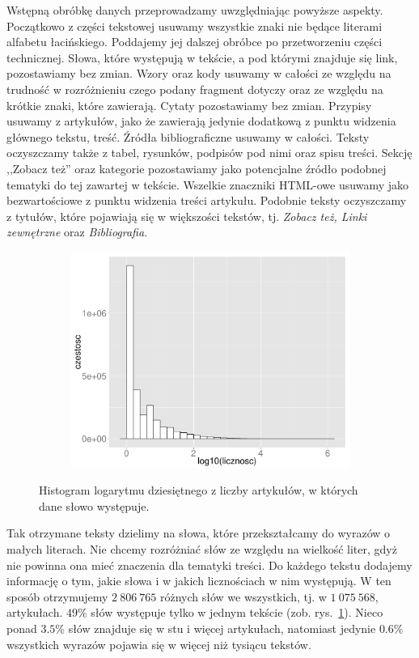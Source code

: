 \documentclass{praca1}
\begin{document}
Wstępną obróbkę danych przeprowadzamy uwzględniając powyższe aspekty. Początkowo z części tekstowej usuwamy wszystkie znaki nie będące literami alfabetu łacińskiego. Poddajemy jej dalszej obróbce po przetworzeniu części technicznej. Słowa, które występują w tekście, a pod którymi znajduje się link, pozostawiamy bez zmian. Wzory oraz kody usuwamy w całości ze względu na trudność w rozróżnieniu czego podany fragment dotyczy oraz ze względu na krótkie znaki, które zawierają. Cytaty pozostawiamy bez zmian. Przypisy usuwamy z artykułów, jako że zawierają jedynie dodatkową z punktu widzenia głównego tekstu, treść. Źródła bibliograficzne usuwamy w całości. Teksty oczyszczamy także z tabel, rysunków, podpisów pod nimi oraz spisu treści. Sekcję ,,Zobacz też'' oraz kategorie pozostawiamy jako potencjalne źródło podobnej tematyki do tej zawartej w tekście. Wszelkie znaczniki HTML-owe usuwamy jako bezwartościowe z punktu widzenia treści artykułu. Podobnie teksty oczyszczamy z tytułów, które pojawiają się w większości tekstów, tj. \emph{Zobacz też, Linki zewnętrzne} oraz \emph{Bibliografia}.

\begin{figure}[!h]
  \centering
  \includegraphics[width=350pt, height=200pt]{plot1.pdf}\\
  \caption{Histogram logarytmu dziesiętnego z liczby artykułów, w których dane słowo występuje.}\label{plot:001}
\end{figure}


Tak otrzymane teksty dzielimy na słowa, które przekształcamy do wyrazów o małych literach. Nie chcemy rozróżniać słów ze względu na wielkość liter, gdyż nie powinna ona mieć znaczenia dla tematyki treści. Do każdego tekstu dodajemy informację o tym, jakie słowa i w jakich licznościach w nim występują. W ten sposób otrzymujemy $2\ 806\ 765$ różnych słów we wszystkich, tj. w $1\ 075\ 568$, artykułach. $49\%$ słów występuje tylko w jednym tekście (zob. rys.~\ref{plot:001}). Nieco ponad $3.5\%$ słów znajduje się w stu i więcej artykułach, natomiast jedynie $0.6\%$ wszystkich wyrazów pojawia się w więcej niż tysiącu tekstów.
\end{document}
